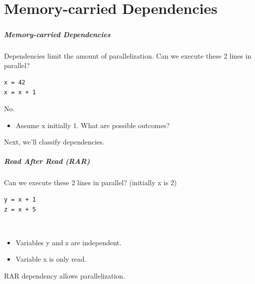 \documentclass[aspectratio=43]{beamer}
\newenvironment{changemargin}[1]{%
  \begin{list}{}{%
    \setlength{\topsep}{0pt}%
    \setlength{\leftmargin}{#1}%
    \setlength{\rightmargin}{1em}
    \setlength{\listparindent}{\parindent}%
    \setlength{\itemindent}{\parindent}%
    \setlength{\parsep}{\parskip}%
  }%
  \item[]}{\end{list}}
\begin{document}
\part{Memory-carried Dependencies}
\frametitle{\partpage}
\begin{frame}[fragile]
\frametitle{Memory-carried Dependencies}
\begin{changemargin}{2.5cm}
\item Dependencies limit the amount of parallelization.
\vfill
Can we execute these 2 lines in parallel?
\begin{lstlisting}
x = 42
x = x + 1  
\end{lstlisting}
\pause
\alert{No.}\\[1em]
\begin{itemize}
\item Assume x initially 1. What are possible outcomes?
\pause \newline {}\\[1em]

\end{itemize}

Next, we'll classify dependencies.

\end{changemargin}

\end{frame}

\begin{frame}[fragile]
\frametitle{Read After Read (RAR)}
\begin{changemargin}{2.5cm}
Can we execute these 2 lines in parallel? (initially x is 2)
\begin{lstlisting}
y = x + 1
z = x + 5
\end{lstlisting}
\pause
{}\\[1em]
\begin{itemize}
\item Variables y and z are independent.
\item Variable x is only read.
\end{itemize}

RAR dependency allows parallelization.

\end{changemargin}

\end{frame}
\end{document}
